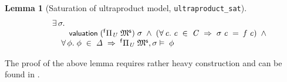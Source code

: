 \documentclass{llncs}
\newtheorem{lm}[thm]{Lemma}
\newenvironment{holmath}{\begin{displaymath}\begin{array}{l}}{\end{array}\end{displaymath}\ignorespacesafterend}
\renewcommand{\HOLConst}[1]{{\textsf{\upshape\small #1}}}
\begin{document}
\begin{lm}[Saturation of ultraproduct model, \texttt{ultraproduct_sat}]
\begin{holmath}
\;\;\;\;\;\;\;\HOLSymConst{\HOLTokenExists{}}\HOLBoundVar{\ensuremath{\sigma}}.\\
\;\;\;\;\;\;\;\;\;\;\;\HOLConst{valuation}\;({}^{\sf f}\Pi\sb{\HOLFreeVar{U}}\;\HOLFreeVar{\ensuremath{\mathfrak{M}\sp{\sf s}}})\;\HOLBoundVar{\ensuremath{\sigma}}\;\HOLSymConst{\HOLTokenConj{}}\;(\HOLSymConst{\HOLTokenForall{}}\HOLBoundVar{c}.\;\HOLBoundVar{c}\;\HOLSymConst{\HOLTokenIn{}}\;\HOLFreeVar{C}\;\HOLSymConst{\HOLTokenImp{}}\;\HOLBoundVar{\ensuremath{\sigma}}\;\HOLBoundVar{c}\;\HOLSymConst{=}\;\HOLFreeVar{f}\;\HOLBoundVar{c})\;\HOLSymConst{\HOLTokenConj{}}\\
\;\;\;\;\;\;\;\;\;\;\;\HOLSymConst{\HOLTokenForall{}}\HOLBoundVar{\ensuremath{\phi}}.\;\HOLBoundVar{\ensuremath{\phi}}\;\HOLSymConst{\HOLTokenIn{}}\;\HOLFreeVar{\ensuremath{\Delta}}\;\HOLSymConst{\HOLTokenImp{}}\;{}^{\sf f}\Pi\sb{\HOLFreeVar{U}}\;\HOLFreeVar{\ensuremath{\mathfrak{M}\sp{\sf s}}},\HOLBoundVar{\ensuremath{\sigma}}\ensuremath{\vDash}\;\HOLBoundVar{\ensuremath{\phi}}
\end{holmath}
\end{lm}
The proof of the above lemma requires rather heavy construction and can be found in \cite{ChangKeisler1990}. 
\end{document}

